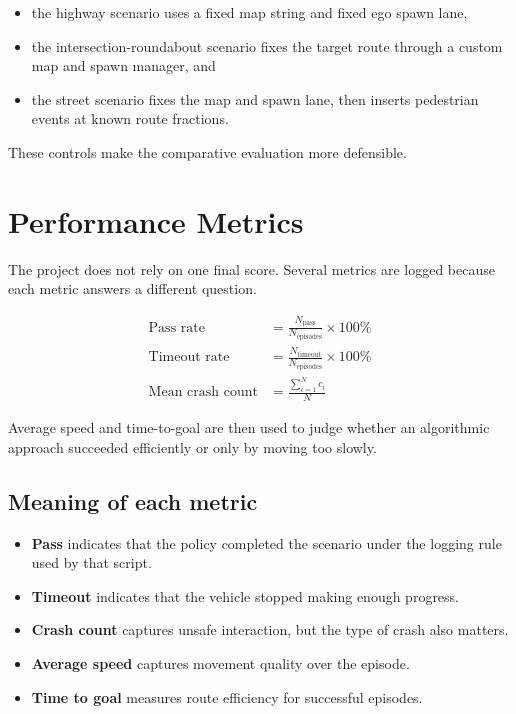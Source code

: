 \documentclass[12pt,a4paper]{report}
\begin{document}
\begin{itemize}
    \item the highway scenario uses a fixed map string and fixed ego spawn lane,
    \item the intersection-roundabout scenario fixes the target route through a custom map and spawn manager, and
    \item the street scenario fixes the map and spawn lane, then inserts pedestrian events at known route fractions.
\end{itemize}

These controls make the comparative evaluation more defensible.

\section{Performance Metrics}
The project does not rely on one final score. Several metrics are logged because each metric answers a different question.

\begin{align}
\text{Pass rate} &= \frac{N_{\text{pass}}}{N_{\text{episodes}}}\times 100\% \\
\text{Timeout rate} &= \frac{N_{\text{timeout}}}{N_{\text{episodes}}}\times 100\% \\
\text{Mean crash count} &= \frac{\sum_{i=1}^{N} c_i}{N}
\end{align}

Average speed and time-to-goal are then used to judge whether an algorithmic approach succeeded efficiently or only by moving too slowly.

\subsection*{Meaning of each metric}
\begin{itemize}
    \item \textbf{Pass} indicates that the policy completed the scenario under the logging rule used by that script.
    \item \textbf{Timeout} indicates that the vehicle stopped making enough progress.
    \item \textbf{Crash count} captures unsafe interaction, but the type of crash also matters.
    \item \textbf{Average speed} captures movement quality over the episode.
    \item \textbf{Time to goal} measures route efficiency for successful episodes.
\end{itemize}
\end{document}
